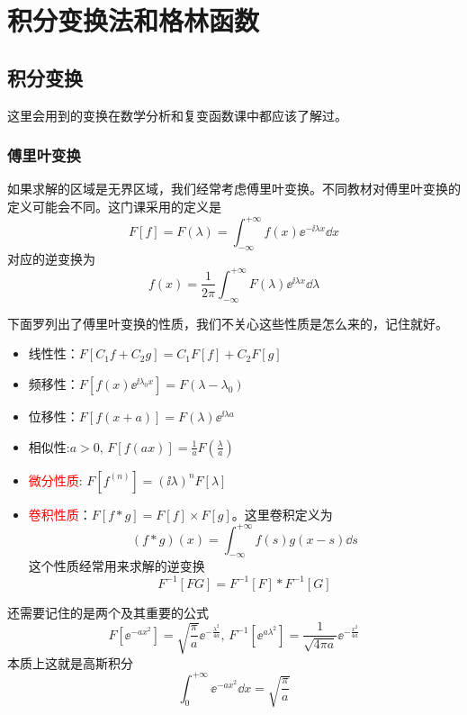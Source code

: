 \chapter{积分变换法和格林函数}
\section{积分变换}
这里会用到的变换在数学分析和复变函数课中都应该了解过。
\subsection{傅里叶变换}
如果求解的区域是无界区域，我们经常考虑傅里叶变换。不同教材对傅里叶变换的定义可能会不同。这门课采用的定义是
\[F\left[f\right] = F\left(\lambda\right) = \int_{-\infty}^{+\infty} f\left(x\right) \ee^{-\ii\lambda x} \dd{x}\]
对应的逆变换为
\[f\left(x\right) = \frac{1}{2 \pi} \int_{-\infty}^{+\infty} F\left(\lambda\right) \ee^{\ii \lambda x} \dd{\lambda}\]

下面罗列出了傅里叶变换的性质，我们不关心这些性质是怎么来的，记住就好。
\begin{itemize}
    \item 线性性：$F\left[C_1 f + C_2 g\right] = C_1 F\left[f\right] + C_2 F\left[g\right]$
    \item 频移性：$F\left[f\left(x\right) \ee^{\ii \lambda_0 x}\right] = F\left(\lambda - \lambda_0\right)$
    \item 位移性：$F\left[f\left(x + a\right)\right] = F\left(\lambda\right) \ee^{\ii \lambda a}$
    \item 相似性:$a > 0, \, F\left[f\left(ax\right)\right] = \frac{1}{a} F\left(\frac{\lambda}{a}\right)$
    \item \textcolor{red}{微分性质}: $F\left[f^{\left(n\right)}\right] = \left(\ii \lambda\right)^n F\left[\lambda\right]$
    \item \textcolor{red}{卷积性质}：$F[f * g] = F\left[f\right] \times F\left[g\right]$。这里卷积定义为
        \[\left(f * g\right)\left(x\right) = \int_{-\infty}^{+\infty} f\left(s\right) g\left(x - s\right) \dd{s}\]
        这个性质经常用来求解的逆变换
        \[F^{-1}\left[F G\right] = F^{-1}\left[F\right] * F^{-1}\left[G\right]\]
\end{itemize}

还需要记住的是两个及其重要的公式
\color{red}
\[F\left[\ee^{- a x^2}\right] = \sqrt{\frac{\pi}{a}} \ee^{-\frac{\lambda^2}{4a}},\, F^{-1}\left[\ee^{a \lambda^2}\right] = \frac{1}{\sqrt{4 \pi a}} \ee^{-\frac{x^2}{4a}}\]
\color{black}
本质上这就是高斯积分
\[\int_{0}^{+\infty} \ee^{-a x^2} \dd{x} = \sqrt{\frac{\pi}{a}}\]

